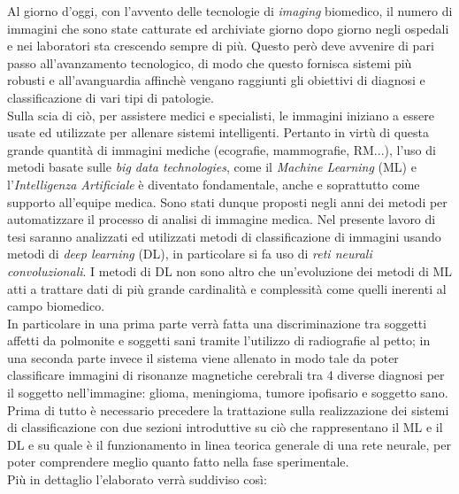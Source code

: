 Al giorno d’oggi, con l’avvento delle tecnologie di \emph{imaging} biomedico,
 il numero di immagini che sono state catturate ed archiviate giorno dopo giorno negli ospedali 
 e nei laboratori sta crescendo sempre di più. Questo però deve avvenire di pari passo all'avanzamento tecnologico,
 di modo
  che questo fornisca sistemi  
  più robusti e all’avanguardia affinchè vengano raggiunti gli obiettivi di diagnosi e classificazione di 
  vari tipi di patologie. \\
Sulla scia di ciò, per assistere medici e specialisti, le immagini iniziano a essere usate 
ed utilizzate per allenare sistemi intelligenti. Pertanto in virtù di questa grande quantità di 
immagini mediche (ecografie, mammografie, RM...), l’uso di metodi basate sulle \emph{big data technologies}, 
come il \emph{Machine Learning} (ML) e l’\emph{Intelligenza Artificiale} è diventato fondamentale, 
anche e soprattutto come supporto all’equipe medica. 
Sono stati dunque proposti negli anni dei metodi per automatizzare il processo di analisi
 di immagine medica. 
Nel presente lavoro di tesi saranno analizzati ed utilizzati metodi di classificazione di 
immagini usando metodi di \emph{deep learning} (DL), in particolare si fa uso di \emph{reti neurali convoluzionali}.
 I metodi di DL non sono altro che un’evoluzione dei metodi di ML 
atti a trattare dati di più grande cardinalità e complessità come quelli inerenti al campo biomedico. \\
In particolare  in una prima parte verrà
 fatta una discriminazione tra soggetti affetti da polmonite e soggetti sani tramite l’utilizzo
  di radiografie al petto; in una seconda parte invece il sistema viene allenato in modo tale da 
  poter classificare immagini di risonanze magnetiche cerebrali tra 4 diverse diagnosi per 
  il soggetto nell’immagine: glioma, meningioma, tumore ipofisario e soggetto sano.
  Prima di tutto è necessario precedere la trattazione sulla realizzazione dei sistemi di classificazione con due sezioni
introduttive su ciò che rappresentano il ML e il DL e su quale è il funzionamento in linea teorica generale di una rete
neurale, per poter comprendere meglio quanto fatto nella fase sperimentale. \\
Più in dettaglio l'elaborato verrà suddiviso così:
